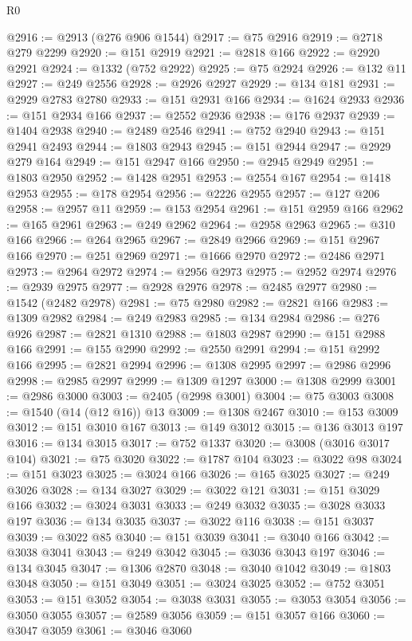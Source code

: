 \begin{lexlean}{R0}
\begin{coremodule}
@2916 := @2913 (@276 @906 @1544)
@2917 := @75 @2916
@2919 := @2718 @279 @2299
@2920 := @151 @2919
@2921 := @2818 @166
@2922 := @2920 @2921
@2924 := @1332 (@752 @2922)
@2925 := @75 @2924
@2926 := @132 @11
@2927 := @249 @2556
@2928 := @2926 @2927
@2929 := @134 @181
@2931 := @2929 @2783 @2780
@2933 := @151 @2931 @166
@2934 := @1624 @2933
@2936 := @151 @2934 @166
@2937 := @2552 @2936
@2938 := @176 @2937
@2939 := @1404 @2938
@2940 := @2489 @2546
@2941 := @752 @2940
@2943 := @151 @2941 @2493
@2944 := @1803 @2943
@2945 := @151 @2944
@2947 := @2929 @279 @164
@2949 := @151 @2947 @166
@2950 := @2945 @2949
@2951 := @1803 @2950
@2952 := @1428 @2951
@2953 := @2554 @167
@2954 := @1418 @2953
@2955 := @178 @2954
@2956 := @2226 @2955
@2957 := @127 @206
@2958 := @2957 @11
@2959 := @153 @2954
@2961 := @151 @2959 @166
@2962 := @165 @2961
@2963 := @249 @2962
@2964 := @2958 @2963
@2965 := @310 @166
@2966 := @264 @2965
@2967 := @2849 @2966
@2969 := @151 @2967 @166
@2970 := @251 @2969
@2971 := @1666 @2970
@2972 := @2486 @2971
@2973 := @2964 @2972
@2974 := @2956 @2973
@2975 := @2952 @2974
@2976 := @2939 @2975
@2977 := @2928 @2976
@2978 := @2485 @2977
@2980 := @1542 (@2482 @2978)
@2981 := @75 @2980
@2982 := @2821 @166
@2983 := @1309 @2982
@2984 := @249 @2983
@2985 := @134 @2984
@2986 := @276 @926
@2987 := @2821 @1310
@2988 := @1803 @2987
@2990 := @151 @2988 @166
@2991 := @155 @2990
@2992 := @2550 @2991
@2994 := @151 @2992 @166
@2995 := @2821 @2994
@2996 := @1308 @2995
@2997 := @2986 @2996
@2998 := @2985 @2997
@2999 := @1309 @1297
@3000 := @1308 @2999
@3001 := @2986 @3000
@3003 := @2405 (@2998 @3001)
@3004 := @75 @3003
@3008 := @1540 (@14 (@12 @16)) @13
@3009 := @1308 @2467
@3010 := @153 @3009
@3012 := @151 @3010 @167
@3013 := @149 @3012
@3015 := @136 @3013 @197
@3016 := @134 @3015
@3017 := @752 @1337
@3020 := @3008 (@3016 @3017 @104)
@3021 := @75 @3020
@3022 := @1787 @104
@3023 := @3022 @98
@3024 := @151 @3023
@3025 := @3024 @166
@3026 := @165 @3025
@3027 := @249 @3026
@3028 := @134 @3027
@3029 := @3022 @121
@3031 := @151 @3029 @166
@3032 := @3024 @3031
@3033 := @249 @3032
@3035 := @3028 @3033 @197
@3036 := @134 @3035
@3037 := @3022 @116
@3038 := @151 @3037
@3039 := @3022 @85
@3040 := @151 @3039
@3041 := @3040 @166
@3042 := @3038 @3041
@3043 := @249 @3042
@3045 := @3036 @3043 @197
@3046 := @134 @3045
@3047 := @1306 @2870
@3048 := @3040 @1042
@3049 := @1803 @3048
@3050 := @151 @3049
@3051 := @3024 @3025
@3052 := @752 @3051
@3053 := @151 @3052
@3054 := @3038 @3031
@3055 := @3053 @3054
@3056 := @3050 @3055
@3057 := @2589 @3056
@3059 := @151 @3057 @166
@3060 := @3047 @3059
@3061 := @3046 @3060

\end{coremodule}
\end{lexlean}

